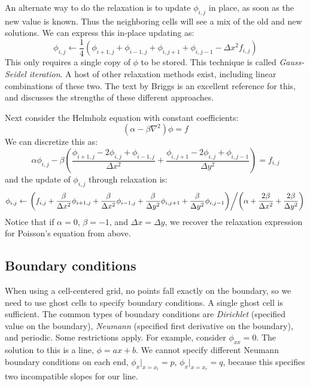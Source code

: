 An alternate way to do the relaxation is to update $\phi_{i,j}$ in
place, as soon as the new value is known.  Thus the neighboring cells
will see a mix of the old and new solutions.  We can express this in-place
updating as:
\begin{equation}
\phi_{i,j} \leftarrow \frac{1}{4} (\phi_{i+1,j} + \phi_{i-1,j} + 
                                   \phi_{i,j+1} + \phi_{i,j-1} - 
                                   \Delta x^2 f_{i,j} )
\end{equation}
This only requires a single copy of $\phi$ to be stored.  This
technique is called {\em Gauss-Seidel iteration}.  A host of other
relaxation methods exist, including linear combinations of these two.
The text by Briggs is an excellent reference for this, and discusses
the strengths of these different approaches.


Next consider the Helmholz equation with constant coefficients:
\begin{equation}
(\alpha - \beta \nabla^2) \phi = f
\end{equation}
We can discretize this as:
\begin{equation}
\alpha \phi_{i,j} - \beta \left ( 
    \frac{\phi_{i+1,j} - 2 \phi_{i,j} + \phi_{i-1,j}}{\Delta x^2} +
    \frac{\phi_{i,j+1} - 2 \phi_{i,j} + \phi_{i,j-1}}{\Delta y^2} \right )
= f_{i,j}
\end{equation}
and the update of $\phi_{i,j}$ through relaxation is:
\begin{equation}
\phi_{i,j} \leftarrow
     \left . \left ( f_{i,j} + \frac{\beta}{\Delta x^2} \phi_{i+1,j}
                             + \frac{\beta}{\Delta x^2} \phi_{i-1,j}
                             + \frac{\beta}{\Delta y^2} \phi_{i,j+1}
                             + \frac{\beta}{\Delta y^2} \phi_{i,j-1} \right ) 
\middle / \left ( \alpha + \frac{2 \beta}{\Delta x^2} + \frac{2 \beta}{\Delta y^2} \right ) \right .
\end{equation}
Notice that if $\alpha = 0$, $\beta = -1$, and $\Delta x = \Delta y$, we 
recover the relaxation expression for Poisson's equation from above.


\subsection{Boundary conditions}

When using a cell-centered grid, no points fall exactly on the
boundary, so we need to use ghost cells to specify boundary conditions.
A single ghost cell is sufficient.  The common types of boundary
conditions are {\em Dirichlet} (specified value on the boundary), {\em
  Neumann} (specified first derivative on the boundary), and periodic.
Some restrictions apply.  For example, consider $\phi_{xx} = 0$.  The
solution to this is a line, $\phi = ax + b$.  We cannot specify different
Neumann boundary conditions on each end, $\phi_x |_{x=x_l} = p$,
$\phi_x |_{x = x_r} = q$, because this specifies two incompatible
slopes for our line.

